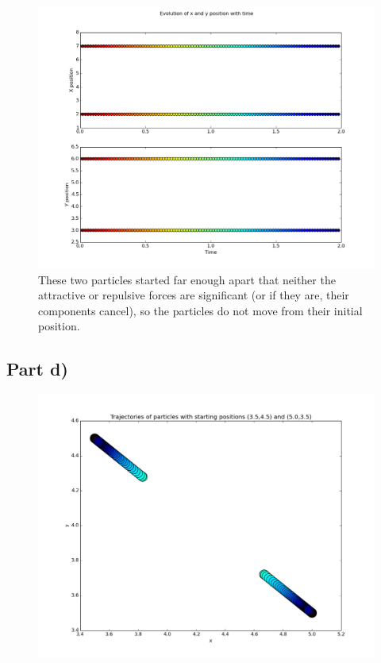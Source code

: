 \documentclass[a4paper,12pt]{article}
\begin{document}
\begin{figure}[H]
\centering
\includegraphics[width = \linewidth]{lab6q5ci.png}
\caption{These two particles started far enough apart that neither the attractive or repulsive forces are significant (or if they are, their components cancel), so the particles do not move from their initial position.}
\label{fig:q5ci}
\end{figure}

\subsection{Part d)}

\begin{figure}[H]
\centering
\includegraphics[width = \linewidth]{lab6q5d.png}
\caption{}
\label{fig:q5d}
\end{figure}
\end{document}
